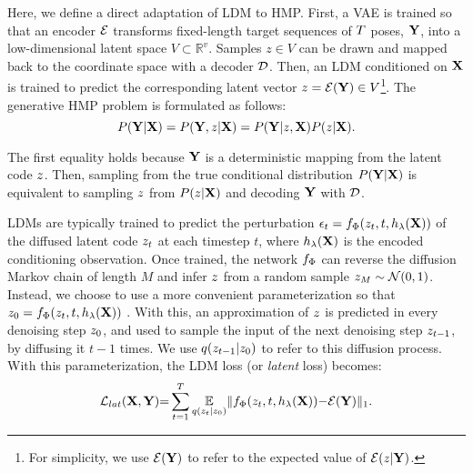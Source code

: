 \documentclass[10pt,twocolumn,letterpaper]{article}
\begin{document}
Here, we define a direct adaptation of LDM to HMP. 
First, a VAE is trained so that an encoder $\mathcal{E}$ transforms fixed-length target sequences of $T$ poses, $\mathbf{Y}$, into a low-dimensional latent space $V \subset \mathbb{R}^{v}$. Samples $z\in V$ can be drawn and mapped back to the coordinate space with a decoder $\mathcal{D}$. 
Then, an LDM conditioned on $\mathbf{X}$ is trained to predict the corresponding latent vector $z = \mathcal{E}(\mathbf{Y}) \in V$\footnote{For simplicity, we use $\mathcal{E}(\mathbf{Y})$ to refer to the expected value of $\mathcal{E}(z | \mathbf{Y})$.}. The generative HMP problem is formulated as follows:
\vspace{-0.15cm}
\begin{equation}
\label{eq:ldm_generative}
P(\pred|\obs)=P(\pred, \latcode|\obs)=P(\pred|\latcode, \obs)P(\latcode|\obs).
\vspace{-0.15cm}
\end{equation}

The first equality holds because $\mathbf{Y}$ is a deterministic mapping from the latent code $z$. Then, sampling from the true conditional distribution $P(\mathbf{Y}|\mathbf{X})$ is equivalent to sampling $z$ from $P(z|\mathbf{X})$ and decoding $\mathbf{Y}$ with $\mathcal{D}$.

LDMs are typically trained to predict the perturbation $\epsilon_t=f_{\Phi}(z_{t}, t, h_{\lambda}(\mathbf{X}))$ of the diffused latent code $z_{t}$ at each timestep $t$, where $h_{\lambda}(\mathbf{X})$ is the encoded conditioning observation. Once trained, the network $f_{\Phi}$ can reverse the diffusion Markov chain of length $M$ and infer $z$ from a random sample $z_M \sim \mathcal{N}(0, 1)$. Instead, we choose to use a more convenient parameterization so that $z_0=f_{\Phi}(z_{t}, t, h_{\lambda}(\mathbf{X}))$ \cite{xiao2021trilemma, luo2022understandingDM}. With this, an approximation of $z$ is predicted in every denoising step $z_{0}$, and used to sample the input of the next denoising step $z_{t-1}$, by diffusing it $t{-}1$ times. We use $q(z_{t-1} | z_0)$ to refer to this diffusion process. 
With this parameterization, the LDM loss (or \textit{latent} loss) becomes:
\vspace{-0.3cm}
\begin{equation}
\label{eq:lat_loss}
    \losslat(\obs, \pred){=}\sum^T_{t=1}
    \underset{q( \diffused | \diffusedStart  )}{\mathbb{E}}
    \|\ldFunction(\diffused, t, \vaeObsEnc(\obs)) {-} \encoder(\pred)\|_{1}.
    \vspace{-0.3cm}
\end{equation}
\end{document}
